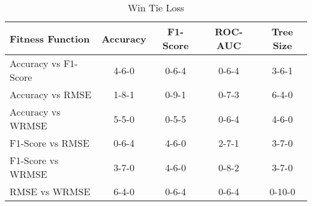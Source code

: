 
    \begin{table}[H]
        \centering
        \renewcommand{\arraystretch}{1.2}
        \caption{Win Tie Loss}
        \label{tab:fitness_test_wtl}
    \begin{tabular}{lcccc}
\toprule
Fitness Function & Accuracy & F1-Score & ROC-AUC & Tree Size \\
\midrule
Accuracy vs F1-Score & 4-6-0 & 0-6-4 & 0-6-4 & 3-6-1 \\
Accuracy vs RMSE & 1-8-1 & 0-9-1 & 0-7-3 & 6-4-0 \\
Accuracy vs WRMSE & 5-5-0 & 0-5-5 & 0-6-4 & 4-6-0 \\
F1-Score vs RMSE & 0-6-4 & 4-6-0 & 2-7-1 & 3-7-0 \\
F1-Score vs WRMSE & 3-7-0 & 4-6-0 & 0-8-2 & 3-7-0 \\
RMSE vs WRMSE & 6-4-0 & 0-6-4 & 0-6-4 & 0-10-0 \\
\bottomrule
\end{tabular}

        
    \end{table}
    